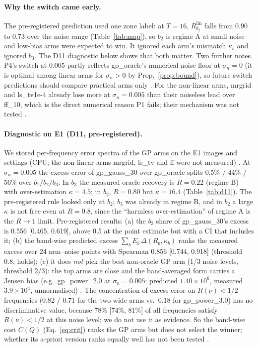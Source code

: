 \paragraph{Why the switch came early.} The pre-registered prediction used one
zone label: at $T=16$, $R^{\mathrm{lin}}_{b_2}$ falls from 0.90 to 0.73 over
the noise range (Table~\ref{tab:map}), so $b_2$ is regime A at small noise and
low-bias arms were expected to win. It ignored each arm's mismatch $\kappa_b$
and ignored $b_3$. The D11 diagnostic below shows that both matter. Two further
notes. P4's switch at 0.005 partly reflects gp\_oracle's numerical noise floor
at $\sigma_n=0$ (it is optimal among linear arms for $\sigma_n>0$ by
Prop.~\ref{prop:bound}), so future switch predictions should compare practical
arms only . For the non-linear arms, mrgrid and ls\_tv1e-4 already
lose more at $\sigma_n=0.005$ than their noiseless lead over ff\_10, which is
the direct numerical reason P1 fails; their mechanism was not tested
.

\paragraph{Diagnostic on E1 (D11, pre-registered).} We stored per-frequency
error spectra of the GP arms on the E1 images and settings (CPU; the
non-linear arms mrgrid, ls\_tv and ff were not measured) . At
$\sigma_n=0.005$ the excess error of gp\_gauss\_30 over gp\_oracle splits
0.5\% / 44\% / 56\% over $b_1/b_2/b_3$. In $b_3$ the measured oracle
recovery is $R=0.22$ (regime B) with over-estimation $\kappa=4.5$; in $b_2$,
$R=0.80$ but $\kappa=16.4$ (Table~\ref{tab:d11}). The pre-registered rule
looked only at $b_2$; $b_3$ was already in regime B, and in $b_2$ a large
$\kappa$ is not free even at $R=0.8$, since the ``harmless over-estimation''
of regime A is the $R\to1$ limit. Pre-registered results: (a) the $b_3$ share
of gp\_gauss\_30's excess is 0.556 [0.465, 0.619], above 0.5 at the point
estimate but with a CI that includes it; (b) the band-wise predicted excess
$\sum_b E_b\,\Delta(R_b,\kappa_b)$ ranks the measured excess over 24 arm--noise
points with Spearman 0.856 [0.744, 0.918] (threshold 0.8, holds); (c) it does
\emph{not} pick the best non-oracle GP arm (1/3 noise levels, threshold 2/3):
the top arms are close and the band-averaged form carries a Jensen bias
(e.g.\ gp\_power\_2.0 at $\sigma_n=0.005$: predicted $1.40\times10^6$,
measured $3.9\times10^4$, unnormalised) . The concentration of excess
error on $R(\nu)<1/2$ frequencies (0.82 / 0.71 for the two wide arms vs.\ 0.18
for gp\_power\_3.0) has no discriminative value, because 78\% [74\%, 81\%] of
all frequencies satisfy $R(\nu)<1/2$ at this noise level; we do not use it
as evidence. So the band-wise cost $C(Q)$ (Eq.~\eqref{eq:crit}) ranks the GP arms but does
not select the winner; whether its a-priori version ranks equally well has not
been tested .

